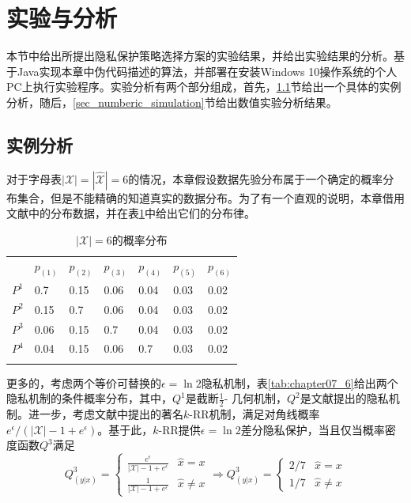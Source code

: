 \section{实验与分析}\label{sec:chapter06-experiment}
本节中给出所提出隐私保护策略选择方案的实验结果，并给出实验结果的分析。基于Java实现本章中伪代码描述的算法，并部署在安装Windows 10操作系统的个人PC上执行实验程序。实验分析有两个部分组成，首先，\ref{sec:case_study}节给出一个具体的实例分析，随后，\ref{sec_numberic_simulation}节给出数值实验分析结果。
\subsection{实例分析}\label{sec:case_study}

对于字母表$|\mathcal{X}| = |\hat{\mathcal{X}}|=6$的情况，本章假设数据先验分布属于一个确定的概率分布集合，但是不能精确的知道真实的数据分布。为了有一个直观的说明，本章借用文献中的分布数据，并在表\ref{tab:chapter07_5}中给出它们的分布律。

\begin{table}[!ht]
    \small
	\caption{$|\mathcal{X}|=6$的概率分布}
	\label{tab:chapter07_5} \centering
	\begin{tabular}{p{1cm}p{1cm}p{1cm}p{1cm}p{1cm}p{1cm}p{1cm}}
		\hline\noalign{\smallskip}
		& $p_{(1)}$ & $p_{(2)}$ & $p_{(3)}$  & $p_{(4)}$ & $p_{(5)}$ & $p_{(6)}$ \\
		\noalign{\smallskip}\hline\noalign{\smallskip}
		$P^{1}$ & 0.7 & 0.15 &0.06 & 0.04 & 0.03 &0.02\\
		$P^{2}$ & 0.15 & 0.7  &0.06 & 0.04 & 0.03  &0.02\\
		$P^{3}$ & 0.06 & 0.15  &0.7 & 0.04 & 0.03  &0.02\\
		$P^{4}$ & 0.04 & 0.15  &0.06 & 0.7 & 0.03  &0.02\\
		\noalign{\smallskip}\hline
	\end{tabular}
\end{table}
更多的，考虑两个等价可替换的$\epsilon=\ln 2$隐私机制，表\ref{tab:chapter07_6}给出两个隐私机制的条件概率分布，其中，$Q^1$是截断$\frac{1}{2}$- 几何机制\cite{ghosh2012universally}，$Q^2$是文献提出的隐私机制。进一步，考虑文献中提出的著名$k$-RR机制，满足对角线概率$e^{\epsilon}/(|\mathcal{X}|-1+e^{\epsilon})$。基于此，$k$-RR提供$\epsilon=\ln 2$差分隐私保护，当且仅当概率密度函数$Q^3$满足
\begin{equation}\nonumber
	Q_{(y|x)}^3 = \begin{cases}
		\frac{e^{\epsilon}}{|\mathcal{X}|-1 +e^{\epsilon}} & \hat{x}=x\\
		\frac{1}{|\mathcal{X}|-1 +e^{\epsilon}} & \hat{x}\neq x
	\end{cases}
	\Rightarrow Q_{(y|x)}^3 = \begin{cases}
		2/7 & \hat{x}=x\\
		1/7 & \hat{x}\neq x
	\end{cases}
\end{equation}

